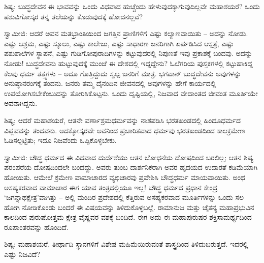 ಶಿಷ್ಯ: ಬುದ್ಧದೇವನ ಈ ಭಾವವನ್ನು ಒಂದು ವಿಧವಾದ ಹುಚ್ಚೆಂದು ಹೇಳುವುದಕ್ಕಾಗುವುದಿಲ್ಲವೇ ಮಹಾಶಯರೆ? ಒಂದು ಪಶುವಿಗೋಸ್ಕರ ತನ್ನ ತಲೆಯನ್ನು ಕೊಡುವುದಕ್ಕೆ ಹೋದನಲ್ಲವೆ?

ಸ್ವಾಮೀಜಿ: ಆದರೆ ಅವನ ಮತಭ್ರಾಂತಿಯಿಂದ ಜಗತ್ತಿನ ಪ್ರಾಣಿಗಳಿಗೆ ಎಷ್ಟು ಕಲ್ಯಾಣವಾಯಿತು – ಅದನ್ನು ನೋಡು. ಎಷ್ಟು ಆಶ್ರಮ, ಎಷ್ಟು ಸ್ಕೂಲು, ಎಷ್ಟು ಕಾಲೇಜು, ಎಷ್ಟು ಸಾಧಾರಣ ಜನರಿಗಾಗಿ ಏರ್ಪಡಿಸಿದ ಆಸ್ಪತ್ರೆ, ಎಷ್ಟು ಪಶುಶಾಲೆಗಳ ಸ್ಥಾಪನೆ, ಎಷ್ಟು ಗುಡಿಗೋಪುರಾದಿಗಳನ್ನು ಕಟ್ಟುವುದರಲ್ಲಿ ನಿಪುಣತೆ ಇವು ಪ್ರಕಾಶಕ್ಕೆ ಬಂದವು. ಅದನ್ನು ನೋಡು! ಬುದ್ಧದೇವನು ಹುಟ್ಟುವುದಕ್ಕೆ ಮುಂಚೆ ಈ ದೇಶದಲ್ಲಿ ಇದ್ದದ್ದೇನು? ಓಲೆಗರಿಯ ಪುಸ್ತಕಗಳಲ್ಲಿ ಕಟ್ಟುಹಾಕಿದ್ದ ಕೆಲವು ಧರ್ಮ ತತ್ತ್ವಗಳು – ಅದೂ ಗೊತ್ತಿದ್ದುದು ಸ್ವಲ್ಪ ಜನರಿಗೆ ಮಾತ್ರ. ಭಗವಾನ್ ಬುದ್ಧದೇವನು ಅವುಗಳನ್ನು ಅನುಷ್ಠಾನರಂಗಕ್ಕೆ ತಂದನು. ಜನರು ತಮ್ಮ ದೈನಂದಿನ ಜೀವನದಲ್ಲಿ ಅವುಗಳನ್ನು ಹೇಗೆ ಕಾರ್ಯದಲ್ಲಿ ಉಪಯೋಗಿಸಬೇಕೆಂಬುದನ್ನು ತೋರಿಸಿಕೊಟ್ಟನು. ಒಂದು ದೃಷ್ಟಿಯಲ್ಲಿ, ನಿಜವಾದ ವೇದಾಂತದ ಜೀವಂತ ಮೂರ್ತಿಯೇ ಅವನಾಗಿದ್ದನು.

ಶಿಷ್ಯ; ಆದರೆ ಮಹಾಶಯರೆ, ಆತನೇ ವರ್ಣಾಶ್ರಮಧರ್ಮವನ್ನು ನಾಶಪಡಿಸಿ ಭರತಖಂಡದಲ್ಲಿ ಹಿಂದೂಧರ್ಮದ ವಿಪ್ಲವವನ್ನು ತಂದವನು. ಅದಕ್ಕೋಸ್ಕರವೇ ಅವನಿಂದ ಪ್ರಚಾರಿತವಾದ ಧರ್ಮವು ಭರತಖಂಡದಿಂದ ಕಾಲಕ್ರಮೇಣ ಓಡಿಸಲ್ಪಟ್ಟಿತು; ಇದೂ ನಿಜವೆಂದು ಒಪ್ಪಿಕೊಳ್ಳಬೇಕು.

ಸ್ವಾಮೀಜಿ: ಬೌದ್ಧ ಧರ್ಮದ ಈ ವಿಧವಾದ ದುರ್ದೆಶೆಯು ಆತನ ಬೋಧನೆಯ ದೋಷದಿಂದ ಬರಲಿಲ್ಲ; ಆತನ ಶಿಷ್ಯ ಪರಂಪರೆಯ ದೋಷದಿಂದಲೇ ಬಂದದ್ದು. ಅವರು ತುಂಬ ದಾರ್ಶನಿಕರಾಗಿ ಅವರ ಹೃದಯದ ಉದಾರತೆ ಕಡಿಮೆಯಾಗಿ ಹೋಯಿತು. ಆಮೇಲೆ ಕ್ರಮೇಣ ವಾಮಾಚಾರದ ವ್ಯಭಿಚಾರವು ಪ್ರವೇಶಿಸಿ ಬೌದ್ಧಧರ್ಮ ಮಾಯವಾಯಿತು. ಅಂಥ ಅಸಹ್ಯಕರವಾದ ವಾಮಾಚಾರ ಈಗ ಯಾವ ತಂತ್ರದಲ್ಲಿಯೂ ಇಲ್ಲ! ಬೌದ್ಧ ಧರ್ಮದ ಪ್ರಧಾನ ಕೇಂದ್ರ ‘ಜಗನ್ನಾಥಕ್ಷೇತ್ರ’ವಾಗಿತ್ತು – ಅಲ್ಲಿ ಮಂದಿರ ಪ್ರದೇಶದಲ್ಲಿ ಕೆತ್ತಿರುವ ಅಸಹ್ಯಕರವಾದ ಮೂರ್ತಿಗಳನ್ನು ಒಂದು ಸಲ ಹೋಗಿ ನೋಡಿಕೊಂಡು ಬಂದರೆ ಈ ವಿಷಯವನ್ನು ತಿಳಿದುಕೊಳ್ಳಬಲ್ಲೆ. ರಾಮಾನುಜ ಮತ್ತು ಚೈತನ್ಯ ಮಹಾಪ್ರಭುವಿನ ಕಾಲದಿಂದ ಪುರುಷೋತ್ತಮ ಕ್ಷೇತ್ರ ವೈಷ್ಣವರ ವಶಕ್ಕೆ ಬಂದಿದೆ. ಈಗ ಅದು ಈ ಮಹಾಪುರುಷರ ಶಕ್ತಿಸಾಮರ್ಥ್ಯದಿಂದ ರೂಪಾಂತರವನ್ನು ಹೊಂದಿದೆ.

ಶಿಷ್ಯ: ಮಹಾಶಯರೆ, ತೀರ್ಥಾದಿ ಸ್ಥಾನಗಳಿಗೆ ವಿಶೇಷ ಮಹಿಮೆಯಿರುವಂತೆ ಶಾಸ್ತ್ರದಿಂದ ತಿಳಿದುಬರುತ್ತದೆ. ಇದರಲ್ಲಿ ಎಷ್ಟು ನಿಜವಿದೆ?

